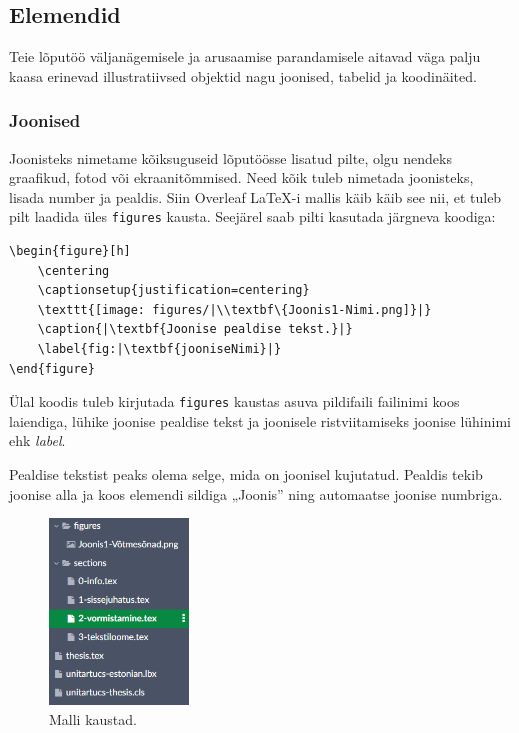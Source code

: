\subsection{Elemendid}
Teie lõputöö väljanägemisele ja arusaamise parandamisele aitavad väga palju kaasa erinevad illustratiivsed objektid nagu joonised, tabelid ja koodinäited.

\subsubsection{Joonised}
Joonisteks nimetame kõiksuguseid lõputöösse lisatud pilte, olgu nendeks graafikud, fotod või ekraanitõmmised. Need kõik tuleb nimetada joonisteks, lisada number ja pealdis. Siin Overleaf LaTeX-i mallis käib käib see nii, et tuleb pilt laadida üles \verb|figures| kausta. Seejärel saab pilti kasutada järgneva koodiga:

\begin{verbatim}
\begin{figure}[h]
    \centering
    \captionsetup{justification=centering}
    \texttt{[image: figures/|\\textbf\{Joonis1-Nimi.png]}|}
    \caption{|\textbf{Joonise pealdise tekst.}|}
    \label{fig:|\textbf{jooniseNimi}|}
\end{figure}
\end{verbatim}

Ülal koodis tuleb kirjutada \verb|figures| kaustas asuva pildifaili failinimi koos laiendiga, lühike joonise pealdise tekst ja joonisele ristviitamiseks joonise lühinimi ehk \emph{label}.

Pealdise tekstist peaks olema selge, mida on joonisel kujutatud. Pealdis tekib joonise alla ja koos elemendi sildiga „Joonis” ning automaatse joonise numbriga.

\begin{figure}
    \centering
    \captionsetup{justification=centering}
    \includegraphics[width=0.33\textwidth]{figures/Joonis2-FiguresKaust.png}
    \caption{Malli kaustad.}
    \label{fig:folders}
\end{figure}

